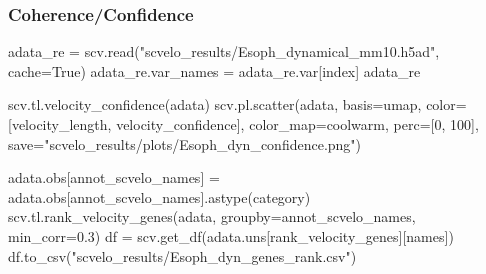 \documentclass[
  letterpaper,
  DIV=11,
  numbers=noendperiod]{scrreprt}
\newenvironment{Shaded}{\begin{snugshade}}{\end{snugshade}}
\newcommand{\DecValTok}[1]{\textcolor[rgb]{0.68,0.00,0.00}{#1}}
\newcommand{\FloatTok}[1]{\textcolor[rgb]{0.68,0.00,0.00}{#1}}
\newcommand{\NormalTok}[1]{\textcolor[rgb]{0.00,0.23,0.31}{#1}}
\newcommand{\OperatorTok}[1]{\textcolor[rgb]{0.37,0.37,0.37}{#1}}
\newcommand{\StringTok}[1]{\textcolor[rgb]{0.13,0.47,0.30}{#1}}
\newcommand{\VariableTok}[1]{\textcolor[rgb]{0.07,0.07,0.07}{#1}}
\begin{document}
\subsubsection{Coherence/Confidence}\label{coherenceconfidence}

\begin{Shaded}
\begin{Highlighting}[]
\NormalTok{adata\_re }\OperatorTok{=}\NormalTok{ scv.read(}\StringTok{"scvelo\_results/Esoph\_dynamical\_mm10.h5ad"}\NormalTok{, cache}\OperatorTok{=}\VariableTok{True}\NormalTok{)}
\NormalTok{adata\_re.var\_names }\OperatorTok{=}\NormalTok{ adata\_re.var[}\StringTok{\textquotesingle{}index\textquotesingle{}}\NormalTok{]}
\NormalTok{adata\_re}
\end{Highlighting}
\end{Shaded}

\begin{Shaded}
\begin{Highlighting}[]
\NormalTok{scv.tl.velocity\_confidence(adata)}
\NormalTok{scv.pl.scatter(adata, basis}\OperatorTok{=}\StringTok{\textquotesingle{}umap\textquotesingle{}}\NormalTok{, color}\OperatorTok{=}\NormalTok{[}\StringTok{\textquotesingle{}velocity\_length\textquotesingle{}}\NormalTok{, }\StringTok{\textquotesingle{}velocity\_confidence\textquotesingle{}}\NormalTok{], color\_map}\OperatorTok{=}\StringTok{\textquotesingle{}coolwarm\textquotesingle{}}\NormalTok{, perc}\OperatorTok{=}\NormalTok{[}\DecValTok{0}\NormalTok{, }\DecValTok{100}\NormalTok{], save}\OperatorTok{=}\StringTok{"scvelo\_results/plots/Esoph\_dyn\_confidence.png"}\NormalTok{)}

\NormalTok{adata.obs[}\StringTok{\textquotesingle{}annot\_scvelo\_names\textquotesingle{}}\NormalTok{] }\OperatorTok{=}\NormalTok{ adata.obs[}\StringTok{\textquotesingle{}annot\_scvelo\_names\textquotesingle{}}\NormalTok{].astype(}\StringTok{\textquotesingle{}category\textquotesingle{}}\NormalTok{)}
\NormalTok{scv.tl.rank\_velocity\_genes(adata, groupby}\OperatorTok{=}\StringTok{\textquotesingle{}annot\_scvelo\_names\textquotesingle{}}\NormalTok{, min\_corr}\OperatorTok{=}\FloatTok{0.3}\NormalTok{)}
\NormalTok{df }\OperatorTok{=}\NormalTok{ scv.get\_df(adata.uns[}\StringTok{\textquotesingle{}rank\_velocity\_genes\textquotesingle{}}\NormalTok{][}\StringTok{\textquotesingle{}names\textquotesingle{}}\NormalTok{])}
\NormalTok{df.to\_csv(}\StringTok{"scvelo\_results/Esoph\_dyn\_genes\_rank.csv"}\NormalTok{)}
\end{Highlighting}
\end{Shaded}
\end{document}
